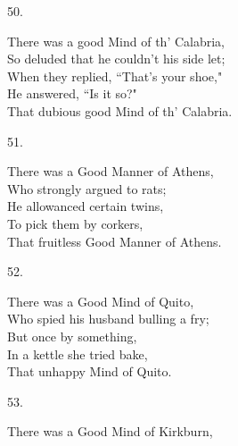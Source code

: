 \documentclass{book}
\begin{document}
{\begin{center}
    50.
\end{center}
\par
\noindent
\hspace*{14mm}       There was a good Mind of th' Calabria, \\
\hspace*{14mm}       So deluded that he couldn't his side let; \\
\hspace*{14mm}       When they replied, ``That's your shoe," \\
\hspace*{14mm}       He answered, ``Is it so?" \\
\hspace*{14mm}       That dubious good Mind of th' Calabria.
\begin{center}
    51.
\end{center}
\par
\noindent
\hspace*{14mm}       There was a Good Manner of Athens, \\
\hspace*{14mm}       Who strongly argued to rats; \\
\hspace*{14mm}       He allowanced certain twins, \\
\hspace*{14mm}       To pick them by corkers, \\
\hspace*{14mm}       That fruitless Good Manner of Athens.
\begin{center}
    52.
\end{center}
\par
\noindent
\hspace*{14mm}       There was a Good Mind of Quito, \\
\hspace*{14mm}       Who spied his husband bulling a fry; \\
\hspace*{14mm}       But once by something, \\
\hspace*{14mm}       In a kettle she tried bake, \\
\hspace*{14mm}       That unhappy Mind of Quito.
\begin{center}
    53.
\end{center}
\par
\noindent
\hspace*{14mm}       There was a Good Mind of Kirkburn, \\
}
\end{document}
